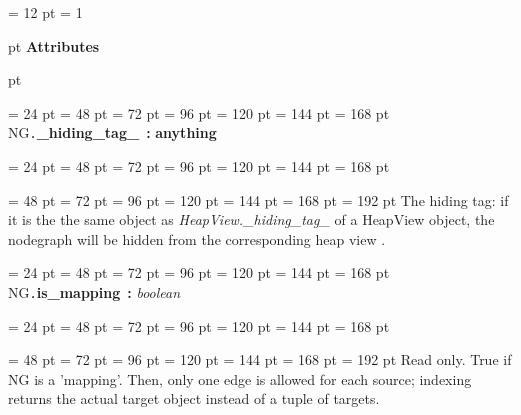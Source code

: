 {{{{\par}
\par}
\par}
{\par \pagebreak[3.300000] \noindent \hangindent = 12 pt \hangafter = 1 
{\par \pagebreak[3]  pt \noindent
{\Large {\bf Attributes\/}}\par {} pt
} \noindent
\par}
{\par \noindent  \leftskip = 24 pt  \leftmargini = 48 pt  \leftmarginii = 72 pt  \leftmarginiii = 96 pt  \leftmarginiv = 120 pt  \leftmarginv = 144 pt  \leftmarginvi = 168 pt NG{\tt .\/}{\bf {\large {\bf {\_}hiding{\_}tag{\_}\/}}\/}~{\bf :} {\bf  anything\/}\par}
{\par \noindent  \leftskip = 24 pt  \leftmargini = 48 pt  \leftmarginii = 72 pt  \leftmarginiii = 96 pt  \leftmarginiv = 120 pt  \leftmarginv = 144 pt  \leftmarginvi = 168 pt {\par \noindent
{\par \noindent  \leftskip = 48 pt  \leftmargini = 72 pt  \leftmarginii = 96 pt  \leftmarginiii = 120 pt  \leftmarginiv = 144 pt  \leftmarginv = 168 pt  \leftmarginvi = 192 pt  The hiding tag: if it is the the same object as  {\em HeapView.{\_}hiding{\_}tag{\_}\/} of a HeapView object, the nodegraph will be hidden from the corresponding heap view .
\par}
\par}
\par}
{\par \noindent  \leftskip = 24 pt  \leftmargini = 48 pt  \leftmarginii = 72 pt  \leftmarginiii = 96 pt  \leftmarginiv = 120 pt  \leftmarginv = 144 pt  \leftmarginvi = 168 pt NG{\tt .\/}{\bf {\large {\bf is{\_}mapping\/}}\/}~{\bf :}  {\em boolean\/}\par}
{\par \noindent  \leftskip = 24 pt  \leftmargini = 48 pt  \leftmarginii = 72 pt  \leftmarginiii = 96 pt  \leftmarginiv = 120 pt  \leftmarginv = 144 pt  \leftmarginvi = 168 pt {\par \noindent
{\par \noindent  \leftskip = 48 pt  \leftmargini = 72 pt  \leftmarginii = 96 pt  \leftmarginiii = 120 pt  \leftmarginiv = 144 pt  \leftmarginv = 168 pt  \leftmarginvi = 192 pt  Read only. True if NG is a 'mapping'. Then, only one edge is
allowed for each source; indexing returns the actual target object
instead of a tuple of targets.
}}}}
